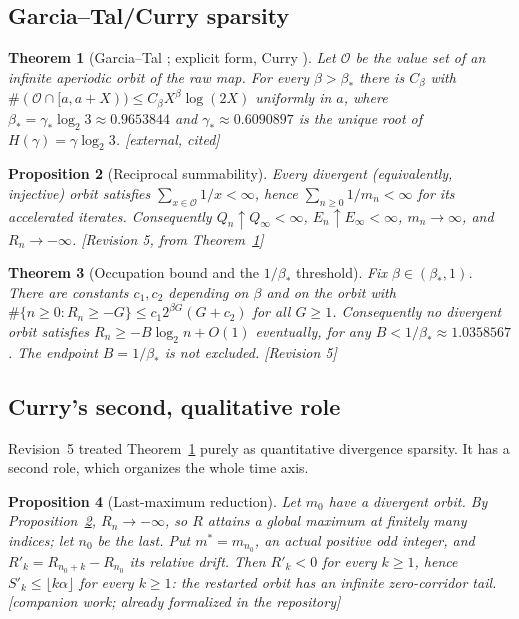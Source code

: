 \documentclass[11pt]{article}
\theoremstyle{plain}
\newtheorem{theorem}{Theorem}[section]
\newtheorem{proposition}[theorem]{Proposition}
\theoremstyle{definition}
\theoremstyle{remark}
\newcommand{\Occ}{\mathcal{O}}
\newcommand{\al}{\alpha}
\newcommand{\status}[1]{\textsf{\footnotesize[#1]}}
\begin{document}
\subsection{Garcia--Tal/Curry sparsity}

\begin{theorem}[Garcia--Tal \cite{GarciaTal}; explicit form, Curry \cite{Curry}]\label{thm:GTC}
Let $\Occ$ be the value set of an infinite aperiodic orbit of the raw map. For every
$\beta>\beta_*$ there is $C_\beta$ with
$\#(\Occ\cap[a,a+X))\le C_\beta X^\beta\log(2X)$ uniformly in $a$, where
$\beta_*=\gamma_*\log_2 3\approx0.9653844$ and $\gamma_*\approx0.6090897$ is the unique root of
$H(\gamma)=\gamma\log_2 3$. \status{external, cited}
\end{theorem}

\begin{proposition}[Reciprocal summability]\label{prop:recip}
Every divergent (equivalently, injective) orbit satisfies $\sum_{x\in\Occ}1/x<\infty$, hence
$\sum_{n\ge0}1/m_n<\infty$ for its accelerated iterates. Consequently $Q_n\uparrow Q_\infty<\infty$,
$E_n\uparrow E_\infty<\infty$, $m_n\to\infty$, and $R_n\to-\infty$. \status{Revision 5, from
Theorem~\ref{thm:GTC}}
\end{proposition}

\begin{theorem}[Occupation bound and the $1/\beta_*$ threshold]\label{thm:betastar}
Fix $\beta\in(\beta_*,1)$. There are constants $c_1,c_2$ depending on $\beta$ and on the orbit with
$\#\{n\ge0:R_n\ge-G\}\le c_1 2^{\beta G}(G+c_2)$ for all $G\ge1$. Consequently no divergent orbit
satisfies $R_n\ge-B\log_2 n+O(1)$ eventually, for any $B<1/\beta_*\approx1.0358567$. The endpoint
$B=1/\beta_*$ is not excluded. \status{Revision 5}
\end{theorem}

\subsection{Curry's second, qualitative role}\label{sec:curryqual}

Revision~5 treated Theorem~\ref{thm:GTC} purely as quantitative divergence sparsity. It has a
second role, which organizes the whole time axis.

\begin{proposition}[Last-maximum reduction]\label{prop:lastmax}
Let $m_0$ have a divergent orbit. By Proposition~\ref{prop:recip}, $R_n\to-\infty$, so $R$ attains
a global maximum at finitely many indices; let $n_0$ be the \emph{last}. Put $m^*=m_{n_0}$, an
actual positive odd integer, and $R'_k=R_{n_0+k}-R_{n_0}$ its relative drift. Then $R'_k<0$ for
every $k\ge1$, hence $S'_k\le\lfloor k\al\rfloor$ for every $k\ge1$: the restarted orbit has an
infinite zero-corridor tail. \status{companion work; already formalized in the repository}
\end{proposition}
\end{document}
